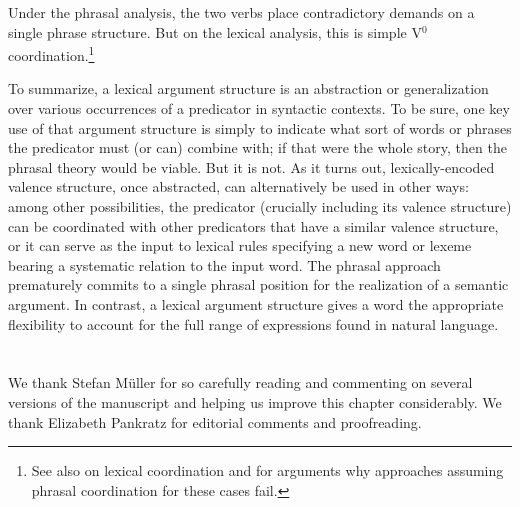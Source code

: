 \documentclass[output=paper,biblatex,babelshorthands,newtxmath,draftmode,colorlinks, citecolor=brown]{langscibook}
\begin{document}
\noindent
Under the phrasal analysis, the two verbs place contradictory demands on a single phrase structure.  But on the lexical analysis, this is simple V$^0$ coordination.\footnote{%
See also  on lexical coordination and for arguments why approaches assuming phrasal coordination for these cases fail.
}%
%
%
 
To summarize, a lexical argument structure is an abstraction or generalization over various occurrences of a predicator in syntactic contexts. To be sure, one key use of that argument structure is simply to indicate what sort of words or phrases the predicator must (or can) combine with; 
if that were the whole story, then the phrasal theory would be viable. But it is not. As it turns out, lexically-encoded valence structure, once abstracted, can alternatively be used in other ways: among other possibilities, the predicator (crucially including its valence structure) can be coordinated with other predicators that have a similar valence structure, or it can serve as the input to lexical rules specifying a new word or lexeme bearing a systematic relation to the input word.   The phrasal approach prematurely commits to a single phrasal position for the realization of 
a semantic argument.  In contrast, a lexical argument structure gives a word the appropriate flexibility to account for the full range of expressions found in natural language.   
 

\section*{\acknowledgmentsUS}

We thank Stefan Müller for so carefully reading and commenting on several versions of the manuscript  and helping us improve this chapter considerably. We thank Elizabeth Pankratz for editorial comments and proofreading.


%
{\sloppy
\printbibliography[heading=subbibliography,notkeyword=this] 
}
\end{document}
